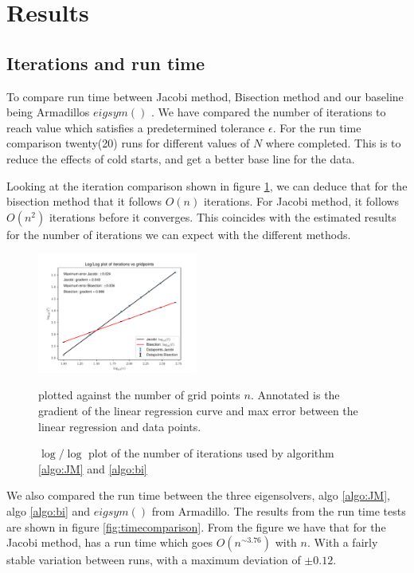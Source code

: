 \documentclass[%
reprint,
nofootinbib,
amsmath,amssymb,
aps,
]{revtex4-1}
\begin{document}
\section{Results}%
\subsection{Iterations and run time}%
To compare run time between Jacobi method, Bisection method and our baseline being Armadillos $eigsym()$ \cite{DBLP:journals/corr/abs-1805-03380, Sanderson2016}. We have compared the number of iterations to reach value which satisfies a predetermined tolerance $\epsilon$. For the run time comparison twenty(20) runs for different values of $N$ where completed. This is to reduce the effects of cold starts, and get a better base line for the data. 

Looking at the iteration comparison shown in figure \ref{fig:iter}, we can deduce that for the bisection method that it follows $O(n)$ iterations. For Jacobi method, it follows $O(n^2)$ iterations before it converges. This coincides with the estimated results for the number of iterations we can expect with the different methods. 
\begin{figure}[h]
	\centering
	\includegraphics[width=0.47\textwidth]{../code/BB_plot/n_iter.pdf}
	\caption{$\log / \log$ plot of the number of iterations used by algorithm \ref{algo:JM} and \ref{algo:bi}} plotted against the number of grid points $n$. Annotated is the gradient of the linear regression curve and max error between the linear regression and data points. 
	\label{fig:iter}
\end{figure}


We also compared the run time between the three eigensolvers, algo \ref{algo:JM}, algo \ref{algo:bi} and $eigsym()$ from Armadillo. The results from the run time tests are shown in figure \ref{fig:timecomparison}. From the figure we have that for the Jacobi method, has a run time which goes $O(n^{\sim 3.76})$ with $n$. With a fairly stable variation between runs, with a maximum deviation of $\pm 0.12$. 
\end{document}
